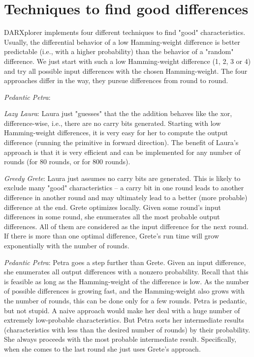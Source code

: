 \documentclass{acmtrans2m}
\begin{document}
\section{Techniques to find good differences}\label{chapter:techniques}
DARXplorer implements four different techniques to find "good" 
characteristics. Usually, the differential behavior of a low 
Hamming-weight difference is better predictable (i.e., with a higher 
probability) than the behavior of a "random" difference. We just start
with such a low Hamming-weight difference (1, 2, 3 or 4) and try all
possible input differences with the chosen Hamming-weight. The four
approaches differ in the way, they pursue differences from round
to round.

\begin{describe}{{\em Pedantic Petra\/}:}
\item[{\em Lazy Laura\/}:]
Laura just "guesses" that the the addition behaves like the xor, 
difference-wise, i.e., there are no carry bits generated. Starting with 
low Hamming-weight differences, it is very easy for her to compute the 
output difference (running the primitive in forward direction). The 
benefit of Laura’s approach is that it is very efficient and can be 
implemented for any number of rounds (for 80 rounds, or for 800 rounds).
  
\item[{\em Greedy Grete\/}:]
Laura just assumes no carry bits are generated. This is likely to 
exclude many "good" characteristics – a carry bit in one round leads 
to another difference in another round and may ultimately lead to a 
better (more probable) difference at the end. Grete optimizes locally. 
Given some round’s input differences in some round, she enumerates all 
the most probable output differences. All of them are considered as 
the input difference for the next round. If there is more than one 
optimal difference, Grete’s run time will grow exponentially with the 
number of rounds.

\item[{\em Pedantic Petra\/}:]
Petra goes a step further than Grete. Given an input difference, she 
enumerates all output differences with a nonzero probability. Recall 
that this is feasible as long as the Hamming-weight of the difference 
is low. As the number of possible differences is growing fast, and 
the Hamming-weight also grows with the number of rounds, this can be 
done only for a few rounds. Petra is pedantic, but not stupid. A naive 
approach would make her deal with a huge number of extremely 
low-probable characteristics. But Petra sorts her intermediate results 
(characteristics with less than the desired number of rounds) by 
their probability. She always proceeds with the most probable 
intermediate result. Specifically, when she comes to the last round 
she just uses Grete’s approach.


\end{describe}
\end{document}
